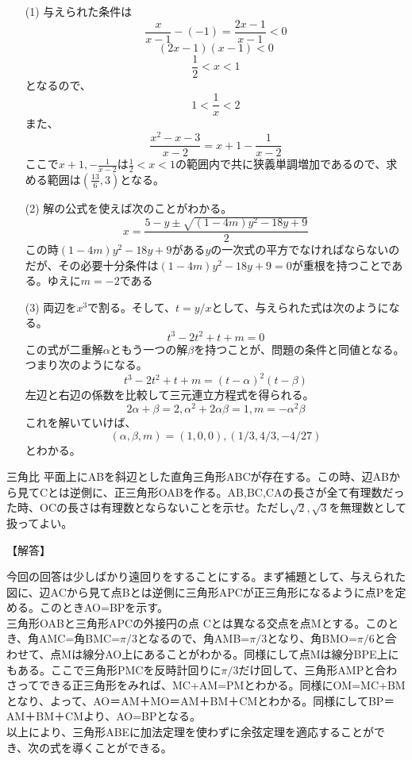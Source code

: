 \documentclass[a4paper,fleqn,dvipdfmx]{jsarticle}
\begin{document}
\begin{itemize}
    \item [(1)] 与えられた条件は
    $$\frac{x}{x-1}-(-1)=\frac{2x-1}{x-1}<0$$
    $$(2x-1)(x-1)<0$$
    $$\frac{1}{2}<x<1$$
    となるので、
    $$1<\frac{1}{x}<2$$
    また、
    $$\frac{x^2-x-3}{x-2}=x+1-\frac{1}{x-2}$$
    ここで$x+1,-\frac{1}{x-2}$は$\frac{1}{2}<x<1$の範囲内で共に狭義単調増加であるので、求める範囲は$(\frac{13}{6},3)$となる。
    \item [(2)] 解の公式を使えば次のことがわかる。$$x=\frac{5-y\pm \sqrt{(1-4m)y^2-18y+9}}{2}$$
    この時$(1-4m)y^2-18y+9$がある$y$の一次式の平方でなければならないのだが、その必要十分条件は$(1-4m)y^2-18y+9=0$が重根を持つことである。ゆえに$m=-2$である
    \item [(3)] 両辺を$x^3$で割る。そして、$t=y/x$として、与えられた式は次のようになる。$$t^3-2t^2+t+m=0$$この式が二重解$\alpha$ともう一つの解$\beta$を持つことが、問題の条件と同値となる。つまり次のようになる。$$t^3-2t^2+t+m=(t-\alpha)^2(t-\beta)$$左辺と右辺の係数を比較して三元連立方程式を得られる。
    $$2\alpha+\beta=2,\alpha^2+2\alpha\beta=1,m=-\alpha^2\beta$$
    これを解いていけば、$$(\alpha,\beta,m)=(1,0,0),(1/3,4/3,-4/27)$$とわかる。
    
\end{itemize}



\newpage

\begin{itembox}[l]{三角比}
平面上にABを斜辺とした直角三角形ABCが存在する。この時、辺ABから見てCとは逆側に、正三角形OABを作る。AB,BC,CAの長さが全て有理数だった時、OCの長さは有理数とならないことを示せ。ただし$\sqrt{2},\sqrt{3}$を無理数として扱ってよい。
\end{itembox}


\begin{flushleft}
【解答】
\end{flushleft}

今回の回答は少しばかり遠回りをすることにする。まず補題として、与えられた図に、辺ACから見て点Bとは逆側に三角形APCが正三角形になるように点Pを定める。このときAO=BPを示す。\\
三角形OABと三角形APCの外接円の点 Cとは異なる交点を点Mとする。このとき、角AMC=角BMC=$\pi/3$となるので、角AMB=$\pi/3$となり、角BMO=$\pi/6$と合わせて、点Mは線分AO上にあることがわかる。同様にして点Mは線分BPE上にもある。ここで三角形PMCを反時計回りに$\pi/3$だけ回して、三角形AMPと合わさってできる正三角形をみれば、MC+AM=PMとわかる。同様にOM=MC+BMとなり、よって、AO＝AM＋MO＝AM＋BM＋CMとわかる。同様にしてBP＝AM＋BM＋CMより、AO=BPとなる。\\
以上により、三角形ABEに加法定理を使わずに余弦定理を適応することができ、次の式を導くことができる。\\
\end{document}
